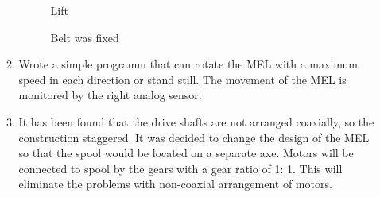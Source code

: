 \begin{enumerate}
\begin{enumerate}
\begin{figure}[H]
\begin{minipage}[h]{0.27\linewidth}
			\end{minipage}
			\hfill
			\begin{minipage}[h]{0.27\linewidth}
			\end{minipage}
			\vfill
			\begin{minipage}[h]{0.4\linewidth}
				\caption{Lift}
			\end{minipage}
			\hfill
			\begin{minipage}[h]{0.58\linewidth}
				\caption{Belt was fixed}
			\end{minipage}
		\end{figure}
		
		\item Wrote a simple programm that can rotate the MEL with a maximum speed in each direction or stand still. The movement of the MEL is monitored by the right analog sensor.
		
		\item It has been found that the drive shafts are not arranged coaxially, so the construction staggered. It was decided to change the design of the MEL so that the spool would be located on a separate axe. Motors will be connected to spool by the gears with a gear ratio of 1: 1. This will eliminate the problems with non-coaxial arrangement of motors.
		

\end{enumerate}
\end{enumerate}
